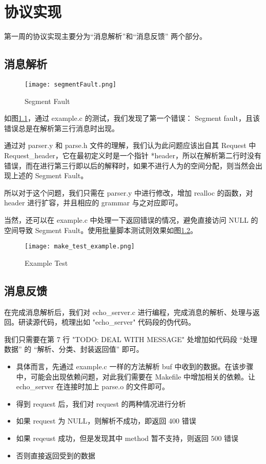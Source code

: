 
\chapter{协议实现}

第一周的协议实现主要分为“消息解析”和“消息反馈” 两个部分。

\section{消息解析}

\begin{figure}[htbp!]
    \centering
    \texttt{[image: segmentFault.png]}
    \caption{Segment Fault}\label{fig:segmentfault}
    \vspace{-1em}
\end{figure}

如图\ref{fig:segmentfault}，通过 example.c 的测试，我们发现了第一个错误： Segment fault，且该错误总是在解析第三行消息时出现。

通过对 parser.y 和 parse.h 文件的理解，我们认为此问题应该出自其 Request 中 Request\_header，它在最初定义时是一个指针 *header，所以在解析第二行时没有错误，而在进行第三行即以后的解释时，如果不进行人为的空间分配，则当然会出现上述的 Segment Fault。

所以对于这个问题，我们只需在 parser.y 中进行修改，增加 realloc 的函数，对 header 进行扩容，并且相应的 grammar 与之对应即可。

当然，还可以在 example.c 中处理一下返回错误的情况，避免直接访问 NULL 的空间导致 Segment Fault。使用批量脚本测试则效果如图\ref{fig:maketestexample}。

\begin{figure}[htbp!]
    \centering
    \texttt{[image: make\_test\_example.png]}
    \caption{Example Test}\label{fig:maketestexample}
    \vspace{-1em}
\end{figure}

\section{消息反馈}

在完成消息解析后，我们对 echo\_server.c 进行编程，完成消息的解析、处理与返回。研读源代码，梳理出如 "echo\_server" 代码段的伪代码。

我们只需要在第 7 行 "TODO: DEAL WITH MESSAGE" 处增加如代码段 “处理数据” 的 “解析、分类、封装返回值” 即可。

\begin{itemize}
    \item 具体而言，先通过 example.c 一样的方法解析 buf 中收到的数据。在该步骤中，可能会出现依赖问题，对此我们需要在 Makefile 中增加相关的依赖。让 echo\_server 在连接时加上 parse.o 的文件即可。
    \item 得到 request 后，我们对 request 的两种情况进行分析
    \item 如果 request 为 NULL，则解析不成功，即返回 400 错误
    \item 如果 reqeust 成功，但是发现其中 method 暂不支持，则返回 500 错误
    \item 否则直接返回受到的数据
\end{itemize}

